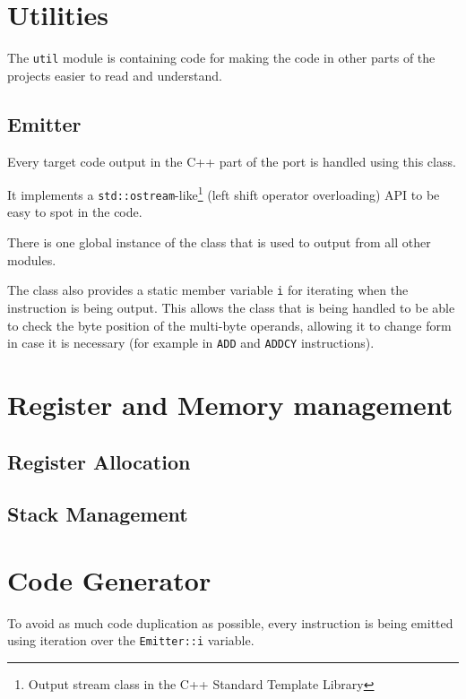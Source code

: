     \section{Utilities}

    The \texttt{util} module is containing code for making the code in other parts of the projects easier to read and understand.

        \subsection{Emitter}\label{emitter}

        Every target code output in the C++ part of the port is handled using this class.

        It implements a \texttt{std::ostream}-like\footnote{Output stream class in the C++ Standard Template Library} (left shift operator overloading) API to be easy to spot in the code.

        There is one global instance of the class that is used to output from all other modules.

        The class also provides a static member variable \texttt{i} for iterating when the instruction is being output. This allows the class that is being handled to be able to check the byte position of the multi-byte operands, allowing it to change form in case it is necessary (for example in \texttt{ADD} and \texttt{ADDCY} instructions).

    \section{Register and Memory management}

    

        \subsection{Register Allocation}

        \subsection{Stack Management}

    \section{Code Generator}

    To avoid as much code duplication as possible, every instruction is being emitted using iteration over the \texttt{Emitter::i} variable.

